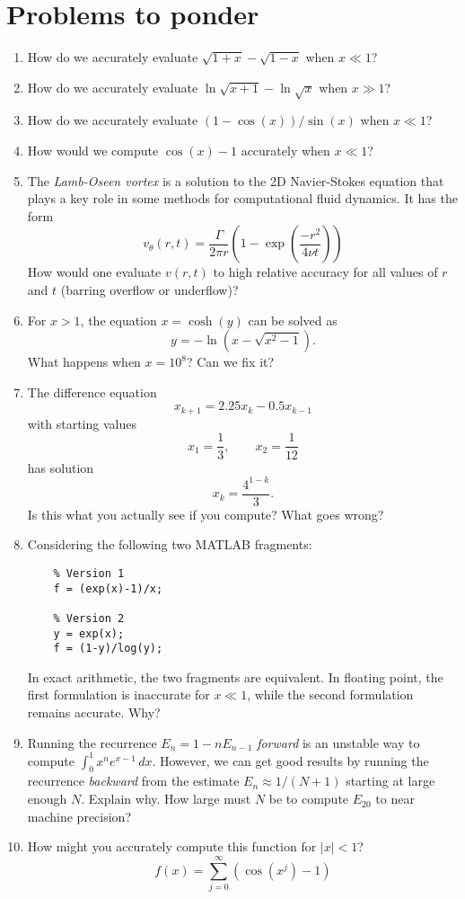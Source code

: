 \documentclass[12pt, leqno]{article} %
\begin{document}
\section{Problems to ponder}

\begin{enumerate}
\item
  How do we accurately evaluate $\sqrt{1+x}-\sqrt{1-x}$ when $x \ll 1$?
\item
  How do we accurately evaluate $\ln \sqrt{x+1}-\ln\sqrt{x}$ when $x \gg 1$?
\item
  How do we accurately evaluate $(1-\cos(x))/\sin(x)$ when $x \ll 1$?
\item
  How would we compute $\cos(x)-1$ accurately when $x \ll 1$?
\item
  The {\em Lamb-Oseen vortex} is a solution to the 2D Navier-Stokes
  equation that plays a key role in some methods for computational
  fluid dynamics.  It has the form
  \[
    v_{\theta}(r,t) = \frac{\Gamma}{2 \pi r}
      \left( 1 - \exp\left( \frac{-r^2}{4 \nu t} \right) \right)
  \]
  How would one evaluate $v(r,t)$ to high relative accuracy for all
  values of $r$ and $t$ (barring overflow or underflow)?
\item
  For $x > 1$, the equation $x = \cosh(y)$ can be solved as
  \[
    y = -\ln\left(x - \sqrt{x^2-1}\right).
  \]
  What happens when $x = 10^8$?  Can we fix it?
\item
  The difference equation
  \[
    x_{k+1} = 2.25x_k - 0.5 x_{k-1}
  \]
  with starting values
  \[
    x_1 = \frac{1}{3}, \qquad x_2 = \frac{1}{12}
  \]
  has solution
  \[
    x_k = \frac{4^{1-k}}{3}.
  \]
  Is this what you actually see if you compute?  What goes wrong?
\item
  Considering the following two MATLAB fragments:
\begin{lstlisting}
    % Version 1
    f = (exp(x)-1)/x;

    % Version 2
    y = exp(x);
    f = (1-y)/log(y);
\end{lstlisting}
  In exact arithmetic, the two fragments are equivalent.  In floating
  point, the first formulation is inaccurate for $x \ll 1$, while the
  second formulation remains accurate.  Why?
\item
  Running the recurrence $E_n = 1-nE_{n-1}$ {\em forward} is an
  unstable way to compute $\int_0^1 x^n e^{x-1} \, dx$.  However, we
  can get good results by running the recurrence {\em backward} from
  the estimate $E_n \approx 1/(N+1)$ starting at large enough $N$.
  Explain why.  How large must $N$ be to compute $E_{20}$ to near
  machine precision?
\item
  How might you accurately compute this function for $|x| < 1$?
  \[
    f(x) = \sum_{j=0}^\infty \left( \cos(x^j)-1 \right)
  \]
\end{enumerate}
\end{document}
